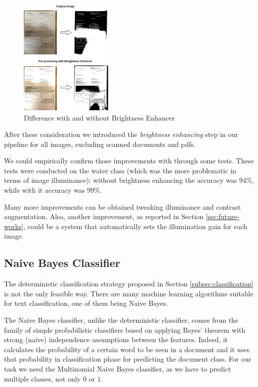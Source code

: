 \documentclass[10pt,twocolumn,letterpaper]{article}
\begin{document}
\begin{figure}[!ht]
  \centering
  \includegraphics[width=0.4\textwidth]{images/bright-contrast-experiment.png}
  \caption{Difference with and without Brightness Enhancer}
  \label{bright-constrast-experiment}
\end{figure}

After these consideration we introduced the \emph{brightness
  enhancing} step in our pipeline for all images, excluding scanned
documents and pdfs.

We could empirically confirm those improvements with through some
tests. These tests were conducted on the water class (which was the
more problematic in terms of image illuminance): without brightness
enhancing the accuracy was $94\%$, while with it accuracy was $99\%$.

Many more improvements can be obtained tweaking illuminance and
contrast augmentation. Also, another improvement, as reported in
Section \ref{sec:future-works}, could be a system that automatically
sets the illumination gain for each image.

\subsection{Naive Bayes Classifier}
\label{subsec:naive-bayes-classifier}

The deterministic classification strategy proposed in Section
\ref{subsec:classification} is not the only feasible way. There are
many machine learning algorithms suitable for text classification, one
of them being Naive Bayes.

The Naive Bayes classifier, unlike the deterministic classifier, comes
from the family of simple probabilistic classifiers based on applying
Bayes' theorem with strong (naive) independence assumptions between
the features. Indeed, it calculates the probability of a certain word
to be seen in a document and it uses that probability in
classification phase for predicting the document class. For our task
we need the Multinomial Naive Bayes classifier, as we have to predict
multiple classes, not only $0$ or $1$.
\end{document}
